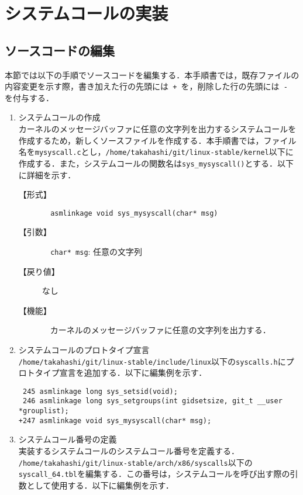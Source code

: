 \documentclass[12pt]{jsarticle}
\begin{document}
\newpage
\section{システムコールの実装}
\label{sec:overview}
\subsection{ソースコードの編集}
本節では以下の手順でソースコードを編集する．本手順書では，既存ファイルの内容変更を示す際，書き加えた行の先頭には\verb| + |を，削除した行の先頭には\verb| - |を付与する．
\begin{enumerate}
\item システムコールの作成\\
  カーネルのメッセージバッファに任意の文字列を出力するシステムコールを作成するため，新しくソースファイルを作成する．本手順書では，ファイル名を\verb|mysyscall.c|とし，\verb|/home/takahashi/git/linux-stable/kernel|以下に作成する．また，システムコールの関数名は\verb|sys_mysyscall()|とする．以下に詳細を示す．
  \begin{description}
  \item[【形式】] \verb|  asmlinkage void sys_mysyscall(char* msg)|
  \item[【引数】] \verb|  char* msg|: 任意の文字列
  \item[【戻り値】] なし
  \item[【機能】] 　カーネルのメッセージバッファに任意の文字列を出力する．
  \end{description}

\item システムコールのプロトタイプ宣言\\
  \verb|/home/takahashi/git/linux-stable/include/linux|以下の\verb|syscalls.h|にプロトタイプ宣言を追加する．以下に編集例を示す．

\begin{verbatim}
 245 asmlinkage long sys_setsid(void);
 246 asmlinkage long sys_setgroups(int gidsetsize, git_t __user *grouplist);
+247 asmlinkage void sys_mysyscall(char* msg);
\end{verbatim}

  \item システムコール番号の定義\\
    実装するシステムコールのシステムコール番号を定義する． \\
    \verb|/home/takahashi/git/linux-stable/arch/x86/syscalls|以下の\verb|syscall_64.tbl|を編集する．この番号は，システムコールを呼び出す際の引数として使用する．以下に編集例を示す．


\end{enumerate}
\end{document}
